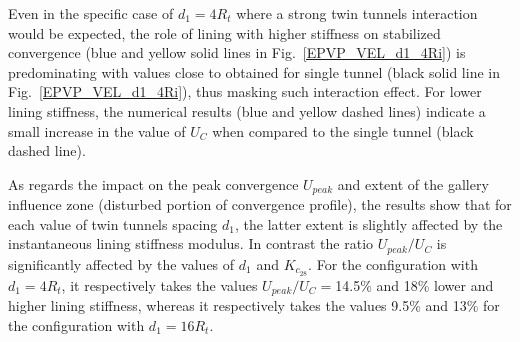 \documentclass[a4paper,fleqn]{cas-sc}
\begin{document}
Even in the specific case of $d_1=4R_t$ where a strong twin tunnels interaction would be expected, the role of lining with higher stiffness on stabilized convergence (blue and yellow solid lines in Fig.~\ref{EPVP_VEL_d1_4Ri}) is predominating with values close to obtained for single tunnel (black solid line in Fig.~\ref{EPVP_VEL_d1_4Ri}), thus masking such interaction effect. For lower lining stiffness, the numerical results (blue and yellow dashed lines) indicate a small increase in the value of  $U_C$  when compared to the single tunnel (black dashed line).

As regards the impact on the peak convergence $U_{peak}$ and extent of the gallery influence zone (disturbed portion of convergence profile), the results show that for each value of twin tunnels spacing $d_1$, the latter extent is slightly affected by the instantaneous lining stiffness modulus. In contrast the ratio $U_{peak}/U_C$ is significantly affected by the values of $d_1$ and  $K_{c_{28}}$. For the configuration with $d_1=4R_t$, it respectively takes the values $U_{peak}/U_C=$14.5\% and 18\% lower and higher lining stiffness, whereas it respectively takes the values 9.5\% and 13\% for the configuration with $d_1=16R_t$. 
\end{document}

